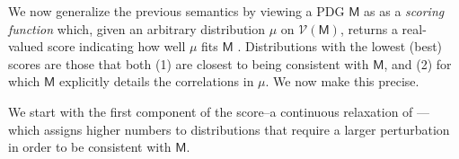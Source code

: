 \documentclass{article}
\newcommand{\V}{\mathcal V}
\newcommand{\sfM}{\mathsf M}
\numberwithin{equation}{section}
\begin{document}
	We now generalize the previous semantics by viewing a PDG $\sfM$ as
	as a \emph{scoring function} which, given an arbitrary distribution $\mu$ on $\V(\sfM)$,
	returns a real-valued score indicating how well $\mu$ fits $\sfM$%
	. Distributions with the lowest (best) scores are those that both (1)
	 are closest to being consistent with $\sfM$, 
	 and (2) for which $\sfM$ explicitly details 
	the correlations in $\mu$.
	We now make this precise.


	We start with the first component of the score--a continuous relaxation of ---which assigns higher numbers to distributions that require a larger perturbation in order to be consistent with $\sfM$. 
%
\end{document}

